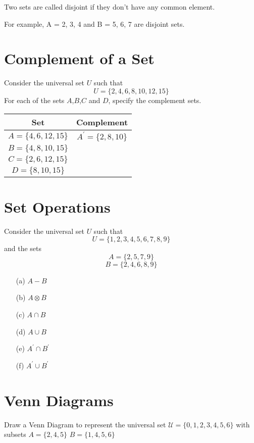 \documentclass[a4paper,12pt]{article}
\begin{document}
Two sets are called disjoint if they don't have any common element.

For example, A = {2, 3, 4} and B = {5, 6, 7} are disjoint sets.


\section*{Complement of a Set}
Consider the universal set $U$ such that
\[U=\{2,4,6,8,10,12,15\} \]
For each of the sets $A$,$B$,$C$ and $D$, specify the complement sets.

\begin{center}
\begin{tabular}{|c|c|}
  \hline
Set & Complement\\
\hline $A=\{4,6,12,15\}$ &
$A^{\prime}=\{2,8,10\}$ \\ \hline $B=\{4,8,10,15\}$ & \\ \hline
$C=\{2,6,12,15\}$ & \\ \hline $D=\{8,10,15\}$ & \\ \hline

\end{tabular}
\end{center}



\section*{Set Operations}
Consider the universal set $U$ such that
\[U=\{1,2,3,4,5,6,7,8,9\} \]
and the sets
\[A=\{2,5,7,9\} \]
\[B=\{2,4,6,8,9\} \]

\begin{itemize}
\item[(a)] $A-B$
\item[(b)] $A \otimes B$
\item[(c)] $A \cap B$
\item[(d)] $A \cup B$
\item[(e)] $A^{\prime} \cap B^{\prime}$
\item[(f)] $A^{\prime} \cup B^{\prime}$
\end{itemize}


\section*{Venn Diagrams}

Draw a Venn Diagram to represent the universal set
$\mathcal{U} = \{0,1,2,3,4,5,6\}$ with subsets
$A = \{2,4,5\}$
$B = \{1,4,5,6\}$
\end{document}
